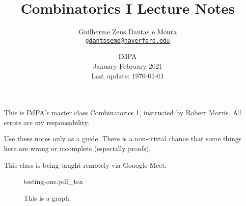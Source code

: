 \documentclass[a4paper, 10pt]{article}
\title{\sffamily \bfseries Combinatorics I Lecture Notes}
\author{\sc Guilherme Zeus Dantas e Moura\\\href{mailto:gdantasemo@haverford.edu}{\texttt{gdantasemo@haverford.edu}}}
\date{IMPA\\January-February 2021\\ Last update: \today}
\newcommand{\incfig}[2][1]{%
    \def\svgwidth{#1\columnwidth}
    {#2.pdf_tex}
}
\begin{document}
    \maketitle
	\sloppy
	
		This is IMPA's master class Combinatorics 1, instructed by Robert Morris.
		All errors are my responsability.

		Use these notes only as a guide. There is a non-trivial chance that some things here are wrong or incomplete (especially proofs).

		This class is being taught remotely via Gooogle Meet.

		\begin{figure}[ht]
			\centering
			\incfig[.8]{testing-one}
			\caption{This is a graph.}
			\label{fig:testing-one}
		\end{figure}
		
	\tableofcontents

	\newpage
    
    
\end{document}
